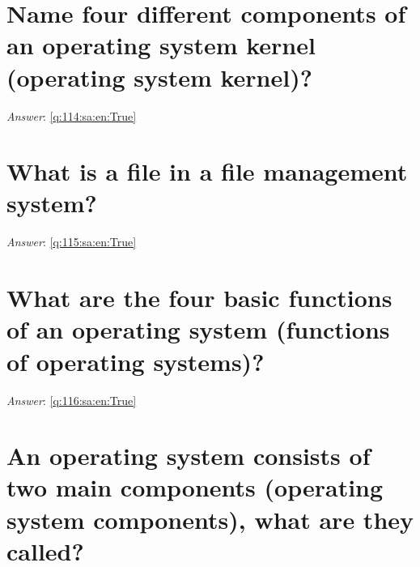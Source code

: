 \documentclass[a4paper,11pt,oneside]{book}
\begin{document}
\begin{sloppypar}
\section{Name four different components of an operating system kernel (operating system kernel)?}

\label{q:114:sa:en:False}

\vspace{2cm}

\noindent\makebox[\textwidth]{\hrulefill}

\vspace{1cm}

\textit{Answer}: \autoref{q:114:sa:en:True}



\section{What is a file in a file management system?}

\label{q:115:sa:en:False}

\vspace{2cm}

\noindent\makebox[\textwidth]{\hrulefill}

\vspace{1cm}

\textit{Answer}: \autoref{q:115:sa:en:True}



\section{What are the four basic functions of an operating system (functions of operating systems)?}

\label{q:116:sa:en:False}

\vspace{2cm}

\noindent\makebox[\textwidth]{\hrulefill}

\vspace{1cm}

\textit{Answer}: \autoref{q:116:sa:en:True}



\section{An operating system consists of two main components (operating system components), what are they called?}

\label{q:118:sa:en:False}


\end{sloppypar}
\end{document}
